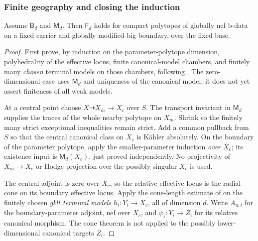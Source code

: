 \subsubsection{Finite geography and closing the induction}

\begin{lemma}
\label{prog:finite-geography}
Assume $\mathsf B_d$ and $\mathsf M_d$. Then $\mathsf F_d$ holds for compact polytopes
of globally nef b-data on a fixed carrier and globally modified-big
boundary, over the fixed base.
\end{lemma}

\begin{proof}
First prove, by induction on the parameter-polytope dimension,
polyhedrality of the effective locus, finite canonical-model chambers,
and finitely many \emph{chosen} terminal models on those chambers,
following \cite[Theorem~5.15]{HX}.
The zero-dimensional case uses $\mathsf M_d$ and uniqueness of the
canonical model; it does not yet assert finiteness of all weak models.

At a central point choose $X\dashrightarrow X_m\to X_c$ over
$S$. The transport invariant in $\mathsf M_d$ supplies the traces
of the whole nearby polytope on $X_m$. Shrink so the finitely many
strict exceptional inequalities remain strict. Add a common pullback
from $S$ so that the central canonical class on $X_c$ is K\"ahler
absolutely. On the boundary of the parameter polytope, apply the
smaller-parameter induction \emph{over $X_c$}; its existence input
is $\mathsf M_d(X_c)$, just proved independently. No projectivity of
$X_m\to X_c$ or Hodge projection over the possibly singular $X_c$
is used.

The central adjoint is zero over $X_c$, so the relative effective
locus is the radial cone on its boundary effective locus. Apply the
cone-length estimate of \cite[Claim~5.1]{HX} on the finitely chosen
\emph{gklt terminal models} $h_i:Y_i\to X_c$, all of dimension $d$.
Write $A_{u,i}$ for the boundary-parameter adjoint, nef over $X_c$,
and $\psi_i:Y_i\to Z_i$ for its relative canonical morphism.
The cone theorem is not applied to the possibly lower-dimensional
canonical targets $Z_i$.


\end{proof}
